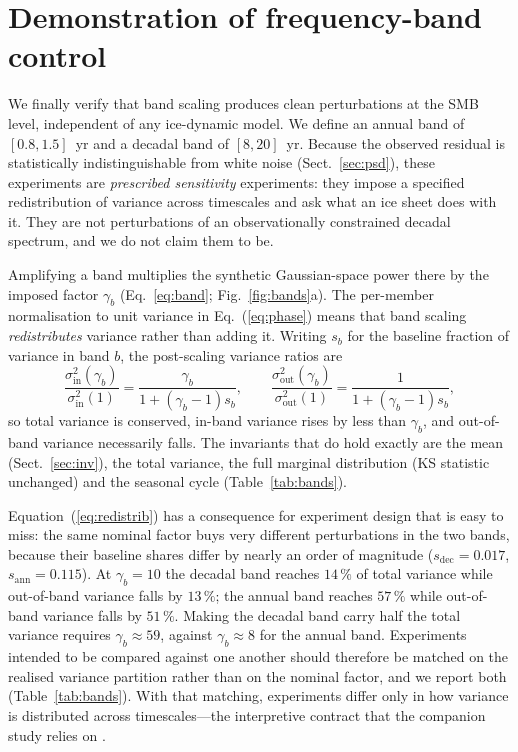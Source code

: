 \section{Demonstration of frequency-band control}\label{sec:demo}

We finally verify that band scaling produces clean perturbations at the SMB
level, independent of any ice-dynamic model. We define an annual band of
$[0.8,1.5]$~yr and a decadal band of $[8,20]$~yr. Because the observed
residual is statistically indistinguishable from white noise
(Sect.~\ref{sec:psd}), these experiments are \emph{prescribed sensitivity}
experiments: they impose a specified redistribution of variance across
timescales and ask what an ice sheet does with it. They are not perturbations
of an observationally constrained decadal spectrum, and we do not claim them
to be.

Amplifying a band multiplies the synthetic Gaussian-space power there by the
imposed factor $\gamma_b$ (Eq.~\ref{eq:band}; Fig.~\ref{fig:bands}a). The
per-member normalisation to unit variance in Eq.~(\ref{eq:phase}) means that
band scaling \emph{redistributes} variance rather than adding it. Writing
$s_b$ for the baseline fraction of variance in band $b$, the post-scaling
variance ratios are
\begin{equation}\label{eq:redistrib}
  \frac{\sigma^2_{\mathrm{in}}(\gamma_b)}{\sigma^2_{\mathrm{in}}(1)}
  = \frac{\gamma_b}{1+(\gamma_b-1)s_b},
  \qquad
  \frac{\sigma^2_{\mathrm{out}}(\gamma_b)}{\sigma^2_{\mathrm{out}}(1)}
  = \frac{1}{1+(\gamma_b-1)s_b},
\end{equation}
so total variance is conserved, in-band variance rises by less than
$\gamma_b$, and out-of-band variance necessarily falls. The invariants that
do hold exactly are the mean (Sect.~\ref{sec:inv}), the total variance, the
full marginal distribution (KS statistic unchanged) and the seasonal cycle
(Table~\ref{tab:bands}).

Equation~(\ref{eq:redistrib}) has a consequence for experiment design that is
easy to miss: the same nominal factor buys very different perturbations in
the two bands, because their baseline shares differ by nearly an order of
magnitude ($s_{\mathrm{dec}}=0.017$, $s_{\mathrm{ann}}=0.115$). At
$\gamma_b=10$ the decadal band reaches $14\,\%$ of total variance while
out-of-band variance falls by $13\,\%$; the annual band reaches $57\,\%$
while out-of-band variance falls by $51\,\%$. Making the decadal band carry
half the total variance requires $\gamma_b\approx59$, against
$\gamma_b\approx8$ for the annual band. Experiments intended to be compared
against one another should therefore be matched on the realised variance
partition rather than on the nominal factor, and we report both
(Table~\ref{tab:bands}). With that matching, experiments differ only in how
variance is distributed across timescales---the interpretive contract that
the companion study relies on \citep{markovsky_inprep}.


